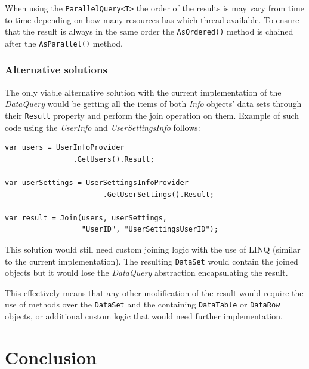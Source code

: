 \documentclass[
  print,
  table,
  nolof,
  nolot,
  nocover,
  oneside
]{fithesis3}
\begin{document}
When using the \texttt{ParallelQuery<T>} the order of the results is may vary from time to time depending on how many resources has which thread available. To ensure that the result is always in the same order the \texttt{AsOrdered()} method is chained after the \texttt{AsParallel()} method.

\subsection{Alternative solutions}
\label{alternative solutions}

The only viable alternative solution with the current implementation of the \textit{DataQuery} would be getting all the items of both \textit{Info} objects' data sets through their \texttt{Result} property and perform the join operation on them. Example of such code using the \textit{UserInfo} and \textit{UserSettingsInfo} follows:
\begin{lstlisting}
var users = UserInfoProvider
                .GetUsers().Result;

var userSettings = UserSettingsInfoProvider
                       .GetUserSettings().Result;
                       
var result = Join(users, userSettings, 
                  "UserID", "UserSettingsUserID");
\end{lstlisting}


This solution would still need custom joining logic with the use of LINQ (similar to the current implementation). The resulting \texttt{DataSet} would contain the joined objects but it would lose the \textit{DataQuery} abstraction encapsulating the result.

This effectively means that any other modification of the result would require the use of methods over the \texttt{DataSet} and the containing \texttt{DataTable} or \texttt{DataRow} objects, or additional custom logic that would need further implementation.



\chapter{Conclusion}
\end{document}
